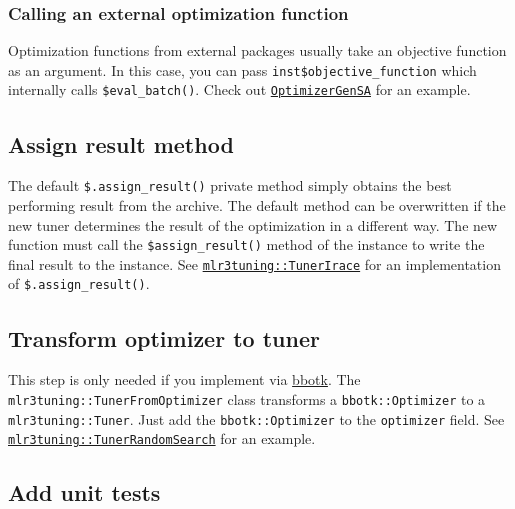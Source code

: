 \documentclass[
]{scrbook}
\begin{document}
\hypertarget{calling-an-external-optimization-function}{%
\subsubsection{Calling an external optimization function}\label{calling-an-external-optimization-function}}

Optimization functions from external packages usually take an objective function as an argument.
In this case, you can pass \texttt{inst\$objective\_function} which internally calls \texttt{\$eval\_batch()}.
Check out \href{https://github.com/mlr-org/bbotk/blob/master/R/OptimizerGenSA.R}{\texttt{OptimizerGenSA}} for an example.

\hypertarget{tuner-add-result}{%
\subsection{Assign result method}\label{tuner-add-result}}

The default \texttt{\$.assign\_result()} private method simply obtains the best performing result from the archive.
The default method can be overwritten if the new tuner determines the result of the optimization in a different way.
The new function must call the \texttt{\$assign\_result()} method of the instance to write the final result to the instance.
See \href{https://github.com/mlr-org/mlr3tuning/blob/master/R/TunerIrace.R}{\texttt{mlr3tuning::TunerIrace}} for an implementation of \texttt{\$.assign\_result()}.

\hypertarget{tuner-from-optimizer}{%
\subsection{Transform optimizer to tuner}\label{tuner-from-optimizer}}

This step is only needed if you implement via \href{https://bbotk.mlr-org.com}{bbotk}.
The \texttt{mlr3tuning::TunerFromOptimizer} class transforms a \texttt{bbotk::Optimizer} to a \texttt{mlr3tuning::Tuner}.
Just add the \texttt{bbotk::Optimizer} to the \texttt{optimizer} field.
See \href{https://github.com/mlr-org/mlr3tuning/blob/master/R/TunerRandomSearch.R}{\texttt{mlr3tuning::TunerRandomSearch}} for an example.

\hypertarget{tuner-test}{%
\subsection{Add unit tests}\label{tuner-test}}
\end{document}
